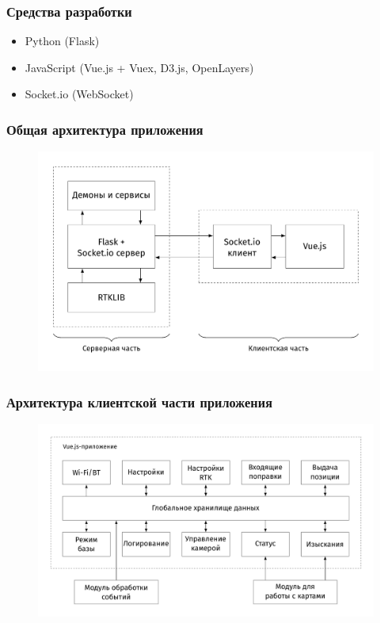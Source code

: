 \documentclass[xetex,t]{beamer}
\begin{document}
%
%
\begin{frame}
  \frametitle{Средства разработки}
  \vskip 1cm
  {
    \Large
    \begin{itemize}
      \item Python (Flask)
      \item JavaScript (Vue.js + Vuex, D3.js, OpenLayers)
      \item Socket.io (WebSocket)
    \end{itemize}
    
  }
\end{frame}


%
%
\begin{frame}
  \frametitle{Общая архитектура приложения}
  \vskip -0.75cm
  \begin{figure}[h]
    \centering
    \includegraphics[width=.95\textwidth]{../img/tikz/system-architecture/pic_sans_no-border}
  \end{figure}
\end{frame}


%
%
\begin{frame}
  \frametitle{Архитектура клиентской части приложения}
  \vskip -0.55cm
  \begin{figure}[h]
    \centering
    \includegraphics[width=.95\textwidth]{../img/tikz/fe-architecture/pic}
  \end{figure}
\end{frame}
\end{document}
